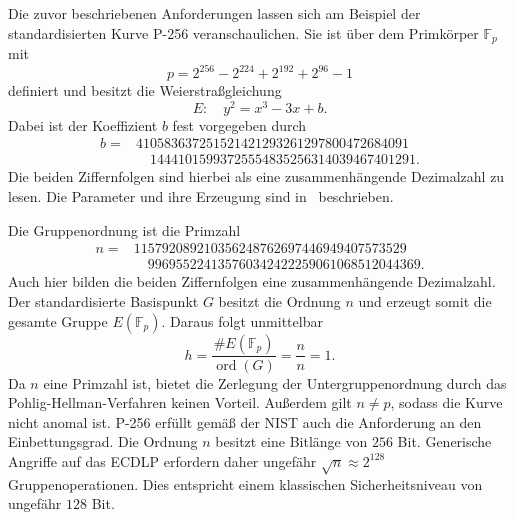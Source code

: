\begin{beispiel}
    Die zuvor beschriebenen Anforderungen lassen sich am
    Beispiel der standardisierten Kurve P-256 veranschaulichen. Sie ist über dem Primkörper $\mathbb{F}_p$ mit
    \[
        p=2^{256}-2^{224}+2^{192}+2^{96}-1
    \]
    definiert und besitzt die Weierstraßgleichung
    \[
        E:\quad y^2=x^3-3x+b.
    \]
    Dabei ist der Koeffizient $b$ fest vorgegeben durch
    \[
        \begin{split}
            b={} & 410583637251521421293261297800472684091       \\
                 & \quad 14441015993725554835256314039467401291.
        \end{split}
    \]
    Die beiden Ziffernfolgen sind hierbei als eine zusammenhängende Dezimalzahl zu lesen. Die Parameter und ihre Erzeugung sind in~\cite[Abschnitt~3.2.1.3. und Anhang~C.2.1.1.]{nist23} beschrieben.

    Die Gruppenordnung ist die Primzahl
    \[
        \begin{split}
            n={} & 115792089210356248762697446949407573529        \\
                 & \quad 996955224135760342422259061068512044369.
        \end{split}
    \]
    Auch hier bilden die beiden Ziffernfolgen eine
    zusammenhängende Dezimalzahl. Der standardisierte Basispunkt $G$ besitzt die Ordnung $n$ und erzeugt somit die gesamte Gruppe $E(\mathbb{F}_p)$. Daraus folgt unmittelbar
    \[
        h=\frac{\#E(\mathbb{F}_p)}{\operatorname{ord}(G)}
        =\frac{n}{n}=1.
    \]
    Da $n$ eine Primzahl ist, bietet die Zerlegung der  Untergruppenordnung durch das Pohlig-Hellman-Verfahren keinen Vorteil. Außerdem gilt $n\neq p$, sodass die Kurve nicht anomal ist. P-256 erfüllt gemäß der NIST auch die Anforderung an den Einbettungsgrad. Die Ordnung $n$ besitzt eine Bitlänge von $256$ Bit. Generische Angriffe auf das ECDLP erfordern daher ungefähr $\sqrt{n}\approx 2^{128}$ Gruppenoperationen. Dies entspricht einem klassischen Sicherheitsniveau von ungefähr $128$ Bit.
\end{beispiel}